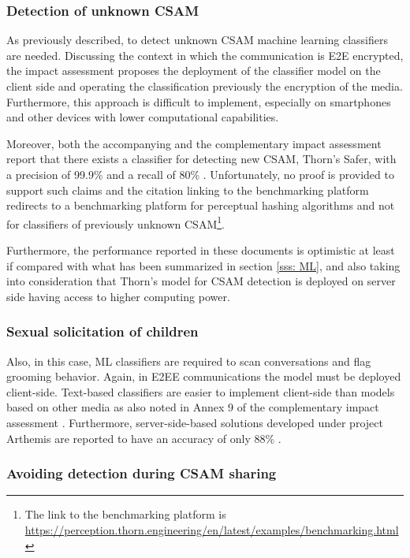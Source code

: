 \subsubsection{Detection of unknown CSAM}

As previously described, to detect unknown CSAM machine learning classifiers are needed. Discussing the context in which the communication is E2E encrypted, the impact assessment proposes the deployment of the classifier model on the client side and operating the classification previously the encryption of the media. Furthermore, this approach is difficult to implement, especially on smartphones and other devices with lower computational capabilities. 

Moreover, both the accompanying and the complementary impact assessment report that there exists a classifier for detecting new CSAM, Thorn's Safer, with a precision of 99.9\% and a recall of 80\% \cite{eu2022impact} \cite{eu2023impact}. Unfortunately, no proof is provided to support such claims and the citation linking to the benchmarking platform redirects to a benchmarking platform for perceptual hashing algorithms and not for classifiers of previously unknown CSAM\footnote{The link to the benchmarking platform is\\ \url{https://perception.thorn.engineering/en/latest/examples/benchmarking.html}}.

Furthermore, the performance reported in these documents is optimistic at least if compared with what has been summarized in section \ref{sss: ML}, and also taking into consideration that Thorn's model for CSAM detection is deployed on server side \cite{Thorn} having access to higher computing power.

\subsubsection{Sexual solicitation of children}

Also, in this case, ML classifiers are required to scan conversations and flag grooming behavior. Again, in E2EE communications the model must be deployed client-side. Text-based classifiers are easier to implement client-side than models based on other media as also noted in Annex 9 of the complementary impact assessment \cite{eu2022impact}. Furthermore, server-side-based solutions developed under project Arthemis are reported to have an accuracy of only 88\% \cite{eu2022impact}.

\subsubsection{Avoiding detection during CSAM sharing}
\label{sss:avoid_detection}

